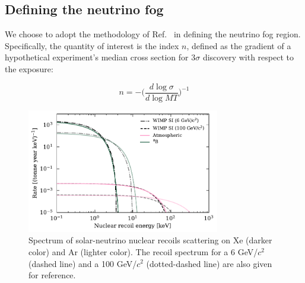 
\subsection{Defining the neutrino fog}

We choose to adopt the methodology of Ref.~\cite{OHare:2021utq} in defining the neutrino fog region. Specifically, the quantity of interest is the index $n$, defined as the gradient of a hypothetical experiment's median cross section for $3\sigma$ discovery with respect to the exposure:

\begin{equation}
    n = -\bigg( \frac{d \log{\sigma}}{d \log{MT}} \bigg)^{-1}
\end{equation}




\begin{figure}
    \centering
    \includegraphics[width=0.75\textwidth]{figures/nu_rates_coherent_combined.pdf}
    \caption{Spectrum of solar-neutrino nuclear recoils scattering on Xe (darker color) and Ar (lighter color). The recoil spectrum for a 6 GeV/$c^2$ (dashed line) and a 100 GeV/$c^2$ (dotted-dashed line) are also given for reference.}
    \label{fig:coherent_solarnu_rates}
\end{figure}


